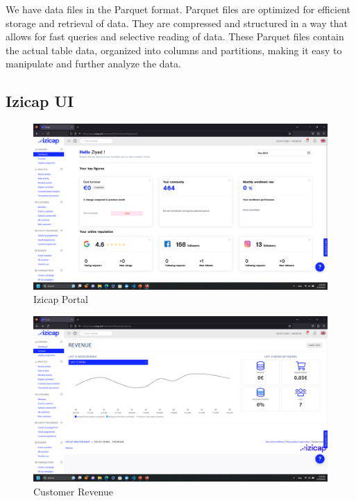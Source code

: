 We have data files in the Parquet format. Parquet files are optimized for efficient storage and retrieval of data. They are compressed and structured in a way that allows for fast queries and selective reading of data. These Parquet files contain the actual table data, organized into columns and partitions, making it easy to manipulate and further analyze the data.

\subsection{Izicap UI}

\begin{figure}[H]
\centering
\includegraphics[width=\linewidth]{images/izicap-portail.png}
\caption{Izicap Portal}\label{fig:izicap-1}
\end{figure}

\begin{figure}[H]
\centering
\includegraphics[width=\linewidth]{images/revenu.png}
\caption{Customer Revenue}\label{fig:izicap-2}
\end{figure}

